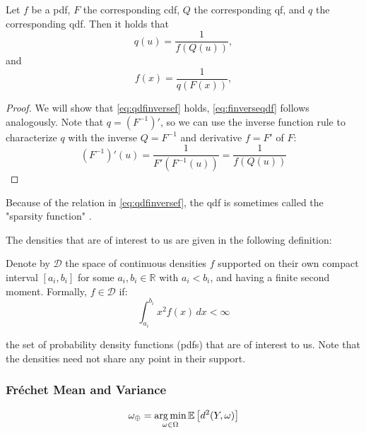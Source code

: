 \begin{lemma}
\label{lemma:f eq inverse qdf}
    Let \(f\) be a pdf, \(F\) the corresponding cdf, \(Q\) the corresponding qf, and
    \(q\) the corresponding qdf. Then it holds that
    \begin{equation}
    \label{eq:qdfinversef}
        {q}(u) = \frac{1}{{f}({Q}(u))},
    \end{equation}
    and
    \begin{equation}
    \label{eq:finverseqdf}
        {f}(x) = \frac{1}{{q}({F}(x))},
    \end{equation}
\end{lemma}
\begin{proof}
    We will show that \eqref{eq:qdfinversef} holds, \eqref{eq:finverseqdf} follows
    analogously. Note that \( q = (F^{-1})' \), so we can use the inverse function
    rule to characterize \(q \) with the inverse $Q = F^{-1}$ and derivative $f = F'$
    of \( F \):
    \begin{equation}
    \label{eq:proof_qdfinversef}
        (F^{-1})'(u) = \frac{1}{{F'}({F^{-1}}(u))} = \frac{1}{{f}({Q}(u))}
    \end{equation}
\end{proof}
Because of the relation in \eqref{eq:qdfinversef}, the qdf is sometimes called the
"sparsity function" \parencite[cf.][]{Tukey1965}.

The densities that are of interest to us are given in the following definition:
\begin{definition}
    \label{def:spaceD}
    Denote by \( \mathcal{D} \) the space of continuous densities \( f \) supported on their own
    compact interval \( [a_i, b_i] \) for some \( a_i, b_i \in \mathbb{R} \) with \( a_i < b_i \),
    and having a finite second moment. Formally, \( f \in \mathcal{D} \) if:
    \[
    \int_{a_i}^{b_i} x^2 f(x) \, dx < \infty
    \]
\end{definition}
the set of probability density functions (pdfs) that are of interest to us. Note that
the densities need not share any point in their support.

\subsubsection{Fréchet Mean and Variance}
\label{sec:f_mean}

\begin{equation}
    \omega_\oplus = \operatorname*{arg\,min}_{\omega \in \Omega} \mathbb{E} \left[ d^2(Y, \omega) \right]
\end{equation}


